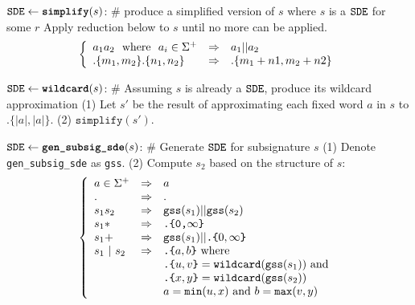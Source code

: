 \begin{small}
\begin{algorithm}[bt]
$\texttt{SDE} \leftarrow {\texttt{\textbf{simplify}}}(s)$: 
\newline
\# produce a simplified version of $s$ where $s$ is a $\texttt{SDE}$ for some $r$ 
\newline
Apply reduction below to $s$ until no more can be applied. \newline
\[
 \left\{
 	\begin{array}{l l l}
		a_1 a_2$ \textrm{ where } $a_i \in \Sigma^+ & \Rightarrow & a_1 \concat a_2 \\
		.\{m_1, m_2\} .\{n_1, n_2\} & \Rightarrow & .\{m_1+n1, m_2+n2\}

	\end{array}
 \right.
\]

$\texttt{SDE} \leftarrow {\texttt{\textbf{wildcard}}}(s)$: 
\newline
\# Assuming $s$ is already a $\texttt{SDE}$, produce its wildcard approximation 
\newline
(1) Let $s'$ be the result of approximating each fixed word $a$ 
in $s$ to $.\{|a|,|a|\}$. \newline
(2) \return $\texttt{simplify}(s')$.

\def\gsde{\texttt{gss}}
$\texttt{SDE} \leftarrow {\texttt{\textbf{gen\_subsig\_sde}}}(s)$: 
\newline
\# Generate $\texttt{SDE}$ for subsignature $s$ \newline
(1) Denote \texttt{gen\_subsig\_sde} as \gsde. \newline
(2) Compute $s_2$ based on the structure of $s$:
\[
\left\{ 
\begin{array}{l l l}
	a \in \Sigma^+ &\Rightarrow & a \\
	. 	& \Rightarrow & . \\
	s_1s_2 & \Rightarrow& \gsde(s_1) \concat \gsde(s_2) \\
	s_1 *& \Rightarrow& \texttt{.\{0,}\infty\texttt{\}} \\
	s_1+ & \Rightarrow& \gsde(s_1) || \texttt{.\{}0,\infty\texttt{\}} \\
	s_1~|~s_2 & \Rightarrow& \texttt{.\{}a,b\texttt{\}} \textrm{ where } \\
	& & \texttt{.\{}u,v\texttt{\}} = \texttt{wildcard}(\gsde(s_1)) 
		\textrm{ and } \\
	& & \texttt{.\{}x,y\texttt{\}} = \texttt{wildcard}(\gsde(s_2))  \\
	& & a = \min(u,x) \textrm{ and } b = \max(v,y)
\end{array}
\right.
\]


\end{algorithm}
\end{small}
